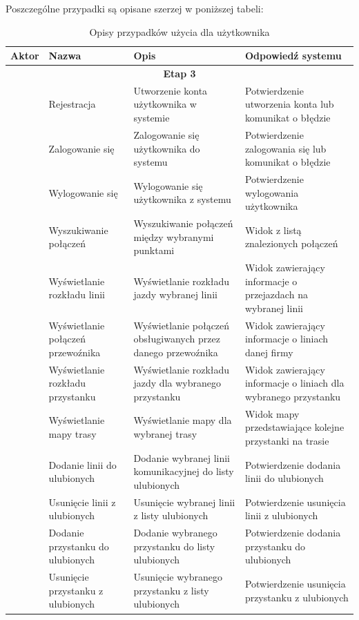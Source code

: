 \documentclass[10pt,a4paper]{article}
\begin{document}
\newpage
\noindent
Poszczególne przypadki są opisane szerzej w poniższej tabeli:
\begin{table}[H]
	\begin{tabularx}{\textwidth}{|c|X|X|X|}
		\hline
		\textbf{Aktor} & \textbf{Nazwa} & \textbf{Opis} & \textbf{Odpowiedź systemu} \\
		\hline
		\multicolumn{4}{|c|}{\textbf{Etap 3}} \\
		\hline
		\multirow{30}{*}{\rotatebox[origin=c]{90}{Użytkownik}}
		& Rejestracja
		& Utworzenie konta użytkownika w systemie
		& Potwierdzenie utworzenia konta lub komunikat o błędzie \\
		\cline{2-4}
		& Zalogowanie się 
		& Zalogowanie się użytkownika do systemu
		& Potwierdzenie zalogowania się lub komunikat o błędzie \\
		\cline{2-4}
		& Wylogowanie się
		& Wylogowanie się użytkownika z systemu
		& Potwierdzenie wylogowania użytkownika \\
		\cline{2-4}
		& Wyszukiwanie połączeń
		& Wyszukiwanie połączeń między wybranymi punktami
		& Widok z listą znalezionych połączeń \\
		\cline{2-4}
		& Wyświetlanie rozkładu linii
		& Wyświetlanie rozkładu jazdy wybranej linii
		& Widok zawierający informacje o przejazdach na wybranej linii \\
		\cline{2-4}
		& Wyświetlanie połączeń przewoźnika
		& Wyświetlanie połączeń obsługiwanych przez danego przewoźnika
		& Widok zawierający informacje o liniach danej firmy \\
		\cline{2-4}
		& Wyświetlanie rozkładu przystanku
		& Wyświetlanie rozkładu jazdy dla wybranego przystanku
		& Widok zawierający informacje o liniach dla wybranego przystanku \\
		\cline{2-4}
		& Wyświetlanie mapy trasy
		& Wyświetlanie mapy dla wybranej trasy
		& Widok mapy przedstawiające kolejne przystanki na trasie \\
		\cline{2-4}
		& Dodanie linii do ulubionych
		& Dodanie wybranej linii komunikacyjnej do listy ulubionych
		& Potwierdzenie dodania linii do ulubionych \\
		\cline{2-4}
		& Usunięcie linii z ulubionych
		& Usunięcie wybranej linii z listy ulubionych
		& Potwierdzenie usunięcia linii z ulubionych \\
		\cline{2-4}
		& Dodanie przystanku do ulubionych
		& Dodanie wybranego przystanku do listy ulubionych
		& Potwierdzenie dodania przystanku do ulubionych \\
		\cline{2-4}
		& Usunięcie przystanku z ulubionych
		& Usunięcie wybranego przystanku z listy ulubionych
		& Potwierdzenie usunięcia przystanku z ulubionych \\
		\hline
	\end{tabularx}
	\caption{Opisy przypadków użycia dla użytkownika}
\end{table}
\end{document}
